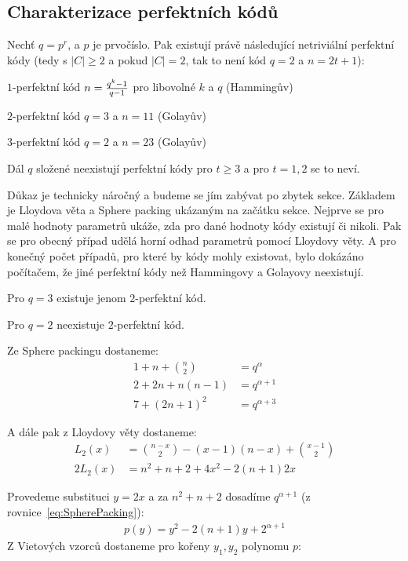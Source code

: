 \subsection{Charakterizace perfektních kódů}

\vt Nechť $q=p^r$, a $p$ je prvočíslo. Pak existují právě následující netriviální perfektní kódy (tedy s $|C| \geq 2$ a pokud $|C| = 2$, tak to není kód $q=2$ a $n=2t+1$):
\begin{description}
	\item $1$-perfektní kód $n={q^k-1 \over q-1}$ pro libovolné $k$ a $q$ (Hammingův)
	\item $2$-perfektní kód $q=3$ a $n=11$ (Golayův)
	\item $3$-perfektní kód $q=2$ a $n=23$ (Golayův)
\end{description}
Dál $q$ složené neexistují perfektní kódy pro $t \geq 3$ a pro $t = 1,2$ se to neví.

Důkaz je technicky náročný a budeme se jím zabývat po zbytek sekce. Základem je Lloydova věta a Sphere packing ukázaným na začátku sekce. Nejprve se pro malé hodnoty parametrů ukáže, zda pro dané hodnoty kódy existují či nikoli. Pak se pro obecný případ udělá horní odhad parametrů pomocí Lloydovy věty. A pro konečný počet případů, pro které by kódy mohly existovat, bylo dokázáno počítačem, že jiné perfektní kódy než Hammingovy a Golayovy neexistují.

\vt Pro $q=3$ existuje jenom $2$-perfektní kód.

\vt Pro $q=2$ neexistuje $2$-perfektní kód.

\dk Ze Sphere packingu dostaneme:
\begin{align}
	1 + n + {n \choose 2} &= q^\alpha  \\
	2 + 2n + n(n-1) &= q^{\alpha + 1} \label{eq:SpherePacking}\\
	7 + (2n + 1)^2 &=q^{\alpha + 3} \label{eq:SpherePacking2}
\end{align}

A dále pak z Lloydovy věty dostaneme:
\begin{align*}
L_2(x) &= {n - x \choose 2} - (x - 1)(n -x) + {x - 1 \choose 2} \\
2L_2(x) &= n^2 + n + 2 + 4x^2 - 2(n + 1)2x
\end{align*}

Provedeme substituci $y = 2x$ a za $n^2 + n + 2$ dosadíme $q^{\alpha + 1}$ (z rovnice~\ref{eq:SpherePacking}):
\begin{align*}
p(y) = y^2 - 2(n+1)y + 2^{\alpha + 1}
\end{align*}
Z Vietových vzorců dostaneme pro kořeny $y_1, y_2$ polynomu $p$:


